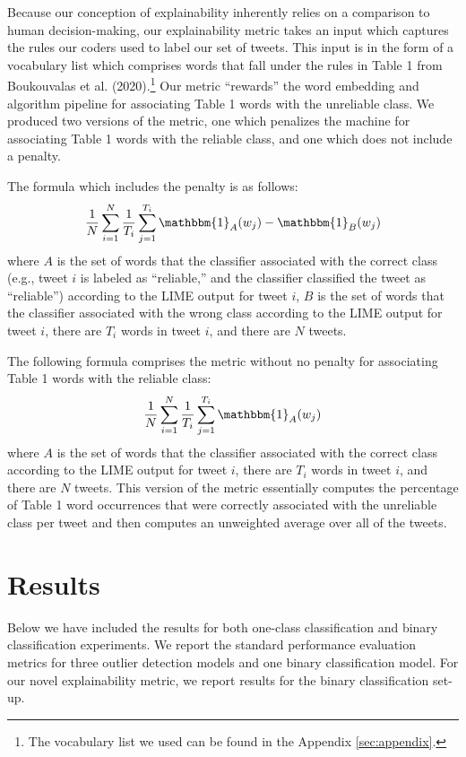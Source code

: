 \documentclass{article}
\begin{document}
Because our conception of explainability inherently relies on a
comparison to human decision-making, our explainability metric takes an
input which captures the rules our coders used to label our set of
tweets. This input is in the form of a vocabulary list which comprises
words that fall under the rules in Table 1 from Boukouvalas et al.
(2020).\footnote{The vocabulary list we used can be found in the
  Appendix \ref{sec:appendix}.} Our metric ``rewards'' the word
embedding and algorithm pipeline for associating Table 1 words with the
unreliable class. We produced two versions of the metric, one which
penalizes the machine for associating Table 1 words with the reliable
class, and one which does not include a penalty.

The formula which includes the penalty is as follows:
\[\frac{1}{N} \sum_{i=1}^{N} \frac{1}{T_i} \sum_{j=1}^{T_i} \mathbbm{1}_A(w_j) - \mathbbm{1}_B(w_j)\]
where \(A\) is the set of words that the classifier associated with the
correct class (e.g., tweet \(i\) is labeled as ``reliable,'' and the
classifier classified the tweet as ``reliable'') according to the LIME
output for tweet \(i\), \(B\) is the set of words that the classifier
associated with the wrong class according to the LIME output for tweet
\(i\), there are \(T_i\) words in tweet \(i\), and there are \(N\)
tweets.

The following formula comprises the metric without no penalty for
associating Table 1 words with the reliable class:
\[\frac{1}{N} \sum_{i=1}^{N} \frac{1}{T_i} \sum_{j=1}^{T_i} \mathbbm{1}_A(w_j)\]
where \(A\) is the set of words that the classifier associated with the
correct class according to the LIME output for tweet \(i\), there are
\(T_i\) words in tweet \(i\), and there are \(N\) tweets. This version
of the metric essentially computes the percentage of Table 1 word
occurrences that were correctly associated with the unreliable class per
tweet and then computes an unweighted average over all of the tweets.

\hypertarget{results}{%
\section{Results}\label{results}}

\label{sec:results} Below we have included the results for both
one-class classification and binary classification experiments. We
report the standard performance evaluation metrics for three outlier
detection models and one binary classification model. For our novel
explainability metric, we report results for the binary classification
set-up.
\end{document}
